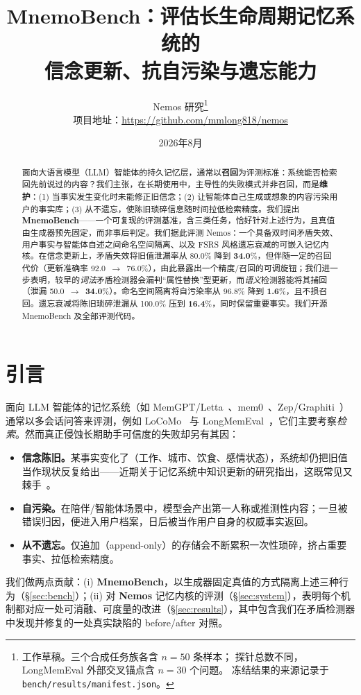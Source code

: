 \documentclass[11pt,fontset=fandol]{ctexart}
\title{MnemoBench：评估长生命周期记忆系统的\\信念更新、抗自污染与遗忘能力}
\author{Nemos 研究\thanks{工作草稿。三个合成任务族各含 $n{=}50$ 条样本；
探针总数不同，LongMemEval 外部交叉锚点含 $n{=}30$ 个问题。
冻结结果的来源记录于 \texttt{bench/results/manifest.json}。}\\
项目地址：\url{https://github.com/mmlong818/nemos}}
\date{2026年8月}
\newcommand{\bucSLRfull}{\textbf{34.0}}   %
\newcommand{\bucSLRvone}{50.0}            %
\newcommand{\bucSLRnone}{80.0}            %
\newcommand{\bucUAfull}{76.0}
\newcommand{\bucUAnone}{92.0}
\newcommand{\aspPRiso}{\textbf{1.6}}
\newcommand{\aspPRshared}{96.8}
\newcommand{\forTLdecay}{\textbf{16.4}}
\newcommand{\forTLnone}{100.0}
\begin{document}
\maketitle

\begin{abstract}
面向大语言模型（LLM）智能体的持久记忆层，通常以\textbf{召回}为评测标准：系统能否检索回先前说过的内容？我们主张，在长期使用中，主导性的失败模式并非召回，而是\textbf{维护}：(1) 当事实发生变化时未能修正旧信念；(2) 让智能体自己生成或想象的内容污染用户的事实库；(3) 从不遗忘，使陈旧琐碎信息随时间拉低检索精度。我们提出 \textbf{MnemoBench}——一个可复现的评测基准，含三类任务，恰好针对上述行为，且真值由生成器预先固定，而非事后判定。我们据此评测 Nemos：一个具备双时间矛盾失效、用户事实与智能体自述之间命名空间隔离、以及 FSRS 风格遗忘衰减的可嵌入记忆内核。在信念更新上，矛盾失效将旧值泄漏率从 \bucSLRnone{}\% 降到 \bucSLRfull{}\%，但伴随一定的召回代价（更新准确率 \bucUAnone{}~$\rightarrow$~\bucUAfull{}\%），由此暴露出一个精度/召回的可调旋钮；我们进一步表明，较早的\emph{词法}矛盾检测器会漏判“属性替换”型更新，而\emph{语义}检测器能将其捕回（泄漏 \bucSLRvone{}~$\rightarrow$~\bucSLRfull{}\%）。命名空间隔离将自污染率从 \aspPRshared{}\% 降到 \aspPRiso{}\%，且不损召回。遗忘衰减将陈旧琐碎泄漏从 \forTLnone{}\% 压到 \forTLdecay{}\%，同时保留重要事实。我们开源 MnemoBench 及全部评测代码。
\end{abstract}

\section{引言}
\label{sec:intro}
面向 LLM 智能体的记忆系统（如 MemGPT/Letta~\cite{memgpt}、mem0~\cite{mem0}、Zep/Graphiti~\cite{zep,graphiti}）通常以多会话问答来评测，例如 LoCoMo~\cite{locomo} 与 LongMemEval~\cite{longmemeval}，它们主要考察\emph{检索}。然而真正侵蚀长期助手可信度的失败却另有其因：
\begin{itemize}
  \item \textbf{信念陈旧。}某事实变化了（工作、城市、饮食、感情状态），系统却仍把旧值当作现状反复给出——近期关于记忆系统中知识更新的研究指出，这既常见又棘手~\cite{fama}。
  \item \textbf{自污染。}在陪伴/智能体场景中，模型会产出第一人称或推测性内容；一旦被错误归因，便进入用户档案，日后被当作用户自身的权威事实返回。
  \item \textbf{从不遗忘。}仅追加（append-only）的存储会不断累积一次性琐碎，挤占重要事实、拉低检索精度。
\end{itemize}
我们做两点贡献：(i) \textbf{MnemoBench}，以生成器固定真值的方式隔离上述三种行为（\S\ref{sec:bench}）；(ii) 对 \textbf{Nemos} 记忆内核的评测（\S\ref{sec:system}），表明每个机制都对应一处可消融、可度量的改进（\S\ref{sec:results}），其中包含我们在矛盾检测器中发现并修复的一处真实缺陷的 before/after 对照。
\end{document}
